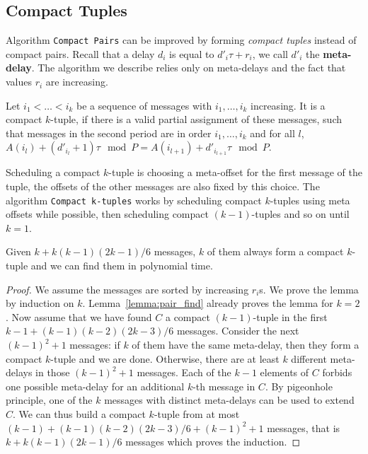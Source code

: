 \documentclass[a4paper,UKenglish,cleveref, autoref, thm-restate]{lipics-v2019}
\newcommand\compactpair{\texttt{Compact Pairs}\xspace}
\begin{document}
\subsection{Compact Tuples}\label{sec:compact}



Algorithm \compactpair can be improved by forming \emph{compact tuples} instead of compact pairs.
Recall that a delay $d_i$ is equal to  $d'_i\tau + r_i$, we call $d'_i$ the \textbf{meta-delay}. 
The algorithm we describe relies only on meta-delays and the fact that values $r_i$ are increasing.

\begin{definition}
Let $i_1 < \dots < i_k$ be a sequence of messages with $i_1,\dots,i_k$ increasing. 
It is a compact $k$-tuple, if there is a valid partial assignment of these messages, such that messages in the second period are in order $i_1,\dots,i_k$ and for all $l$, $A(i_l) + (d'_{i_l} + 1)\tau \mod P = A(i_{l+1}) + d'_{i_{l+1}}\tau \mod P$.
\end{definition}

 Scheduling a compact $k$-tuple is choosing a meta-offset for the first message of the tuple, the offsets of the 
other messages are also fixed by this choice.  
The algorithm \texttt{Compact k-tuples} works by scheduling compact $k$-tuples using meta offsets while possible, then scheduling compact $(k-1)$-tuples and so on until $k=1$.


\begin{lemma}\label{lemma:uple_find}
Given $k + k(k-1)(2k-1)/6$ messages, $k$ of them always form a compact $k$-tuple and we can find them in polynomial time. 
\end{lemma}
\begin{proof}
We assume the messages are sorted by increasing $r_i$s. We prove the lemma by induction on $k$. Lemma~\ref{lemma:pair_find} already proves the lemma for $k=2$.
Now assume that we have found $C$ a compact $(k-1)$-tuple in the first $k-1 + (k-1)(k-2)(2k-3)/6$
messages. Consider the next $(k-1)^2 + 1$ messages: if $k$ of them have the same meta-delay,
then they form a compact $k$-tuple and we are done. Otherwise, there are at least $k$ different meta-delays in those $(k-1)^2 + 1$ messages. Each of the $k-1$ elements of $C$ forbids one possible meta-delay for an additional $k$-th message in $C$. By pigeonhole principle, one of the $k$ messages with distinct meta-delays can be used to extend $C$. We can thus build a compact $k$-tuple from at most $(k-1) + (k-1)(k-2)(2k-3)/6 + (k-1)^2 + 1$ messages, that is $k + k(k-1)(2k-1)/6$ messages which proves the induction.
\end{proof}
\end{document}
